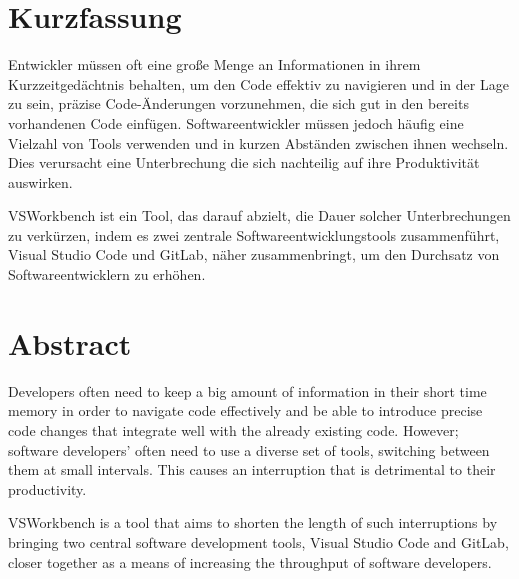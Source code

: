 \section*{Kurzfassung}
Entwickler müssen oft eine große Menge an Informationen in ihrem Kurzzeitgedächtnis behalten, um den Code effektiv zu navigieren und in der Lage zu sein,
präzise Code-Änderungen vorzunehmen, die sich gut in den bereits vorhandenen Code einfügen. Softwareentwickler müssen jedoch häufig eine
Vielzahl von Tools verwenden und in kurzen Abständen zwischen ihnen wechseln. Dies verursacht eine Unterbrechung die sich
nachteilig auf ihre Produktivität auswirken. 

VSWorkbench ist ein Tool, das darauf abzielt, die Dauer solcher Unterbrechungen zu verkürzen,
indem es zwei zentrale Softwareentwicklungstools zusammenführt, Visual Studio Code und GitLab, näher zusammenbringt, um den Durchsatz 
von Softwareentwicklern zu erhöhen. 

\begingroup
	
	\section*{Abstract}

    
    Developers often need to keep a big amount of information in their short time memory in order to navigate code effectively and be able to introduce precise code
    changes that integrate well with the already existing code.
    However; software developers' often need to use a diverse set of tools, switching between them at small intervals. This causes an interruption 
    that is detrimental to their productivity. 
    
    VSWorkbench is a tool that aims to shorten the length of such interruptions by bringing two central software development tools, 
    Visual Studio Code and GitLab, closer together as a means of increasing the throughput of software developers. 


	
\endgroup

